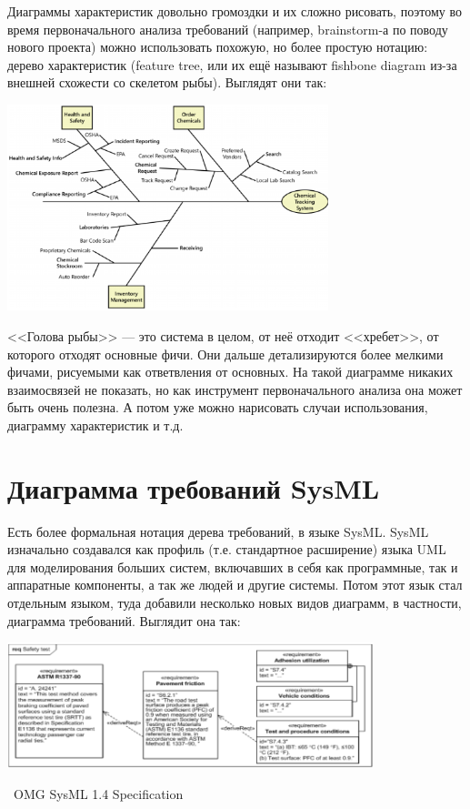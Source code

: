 \documentclass[a5paper]{article}
\newcommand{\attribution}[1] {
    \vspace{-4mm}\begin{flushright}\begin{scriptsize}%
    {\textcopyright\, #1}\end{scriptsize}\end{flushright}
}
\begin{document}
Диаграммы характеристик довольно громоздки и их сложно рисовать, поэтому во время первоначального анализа требований (например, brainstorm-а по поводу нового проекта) можно использовать похожую, но более простую нотацию: дерево характеристик (feature tree, или их ещё называют fishbone diagram из-за внешней схожести со скелетом рыбы). Выглядят они так:

\begin{center}
    \includegraphics[width=0.7\textwidth]{featureTree.png}
\end{center}

<<Голова рыбы>> --- это система в целом, от неё отходит <<хребет>>, от которого отходят основные фичи. Они дальше детализируются более мелкими фичами, рисуемыми как ответвления от основных. На такой диаграмме никаких взаимосвязей не показать, но как инструмент первоначального анализа она может быть очень полезна. А потом уже можно нарисовать случаи использования, диаграмму характеристик и т.д.

\section{Диаграмма требований SysML}

Есть более формальная нотация дерева требований, в языке SysML. SysML изначально создавался как профиль (т.е. стандартное расширение) языка UML для моделирования больших систем, включавших в себя как программные, так и аппаратные компоненты, а так же людей и другие системы. Потом этот язык стал отдельным языком, туда добавили несколько новых видов диаграмм, в частности, диаграмма требований. Выглядит она так:

\begin{center}
    \includegraphics[width=0.8\textwidth]{sysMlRequirementDiagram.png}
    \attribution{OMG SysML 1.4 Specification}
\end{center}
\end{document}
